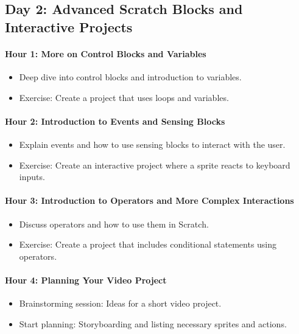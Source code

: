 \documentclass[main.tex]{subfiles}
\begin{document}
\subsection*{Day 2: Advanced Scratch Blocks and Interactive Projects}

\paragraph{Hour 1: More on Control Blocks and Variables}
\begin{itemize}
  \item Deep dive into control blocks and introduction to variables.
  \item Exercise: Create a project that uses loops and variables.
\end{itemize}

\paragraph{Hour 2: Introduction to Events and Sensing Blocks}
\begin{itemize}
  \item Explain events and how to use sensing blocks to interact with the user.
  \item Exercise: Create an interactive project where a sprite reacts to keyboard inputs.
\end{itemize}

\paragraph{Hour 3: Introduction to Operators and More Complex Interactions}
\begin{itemize}
  \item Discuss operators and how to use them in Scratch.
  \item Exercise: Create a project that includes conditional statements using operators.
\end{itemize}

\paragraph{Hour 4: Planning Your Video Project}
\begin{itemize}
  \item Brainstorming session: Ideas for a short video project.
  \item Start planning: Storyboarding and listing necessary sprites and actions.
\end{itemize}
\end{document}
